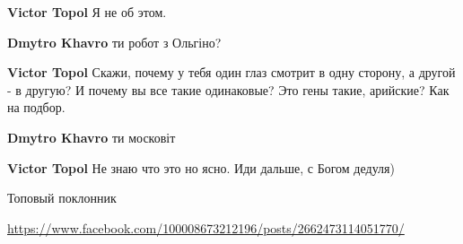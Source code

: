 \begin{itemize}
\begin{itemize}
\begin{itemize}
 
\textbf{Victor Topol} Я не об этом.

 
\textbf{Dmytro Khavro} ти робот з Ольгіно?

 
\textbf{Victor Topol} Скажи, почему у тебя один глаз смотрит в одну сторону, а другой - в другую?
И почему вы все такие одинаковые? Это гены такие, арийские? Как на подбор.

 
\textbf{Dmytro Khavro} ти московіт

 
\textbf{Victor Topol} Не знаю что это но ясно.
Иди дальше, с Богом дедуля)

\end{itemize}

\end{itemize}


Топовый поклонник
 
\url{https://www.facebook.com/100008673212196/posts/2662473114051770/}



\end{itemize}
